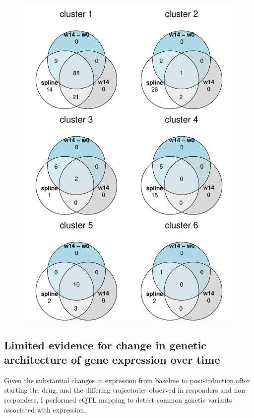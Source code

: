 \begin{outline}
\begin{figure}
    \centering
    \includegraphics[width=1.0\textwidth,page=1]{mainmatter/figures/chapter_04/plot_gene_set_enrichment.spline_cluster_venns.pdf}
    \caption{}
    \label{fig:plot_gene_set_enrichment.spline_cluster_venns.pdf}
\end{figure}
    
\subsection{Limited evidence for change in genetic architecture of gene expression over time}

Given the substantial changes in expression from baseline to post-induction,after starting the drug, and the differing trajectories observed in responders and non-responders, I performed \gls{eQTL} mapping to detect common genetic variants associated with expression.


\end{outline}

